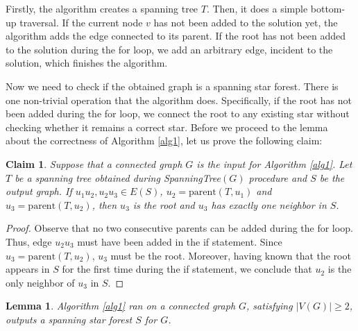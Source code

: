 \documentclass[en]{pracamgr}
\newtheorem{lemma}{Lemma}
\newtheorem{claim}{Claim}
\theoremstyle{definition}
\begin{document}
Firstly, the algorithm creates a spanning tree $T$. Then, it does a simple bottom-up traversal. If the current node $v$ has not been added to the solution yet, the algorithm adds the edge connected to its parent. If the root has not been added to the solution during the for loop, we add an arbitrary edge, incident to the solution, which finishes the algorithm.

Now we need to check if the obtained graph is a spanning star forest. There is one non-trivial operation that the algorithm does. Specifically, if the root has not  been added during the for loop, we connect the root to any existing star without checking whether it remains a correct star. Before we proceed to the lemma about the correctness of Algorithm \ref{alg1}, let us prove the following claim:

\begin{claim}\label{ssf root}
	Suppose that a connected graph $G$ is the input for Algorithm \ref{alg1}. Let $T$ be a spanning tree obtained during \textrm{SpanningTree}$(G)$ procedure and $S$ be the output graph. If $u_1 u_2,u_2 u_3 \in E(S)$, $u_2 = \textrm{parent}(T,u_1)$ and $u_3=\textrm{parent}(T,u_2)$, then $u_3$ is the root and $u_3$ has exactly one neighbor in $S$.
\end{claim}

\begin{proof}
	Observe that no two consecutive parents can be added during the for loop. Thus, edge $u_2 u_3$ must have been added in the if statement. Since $u_3 = \textrm{parent}(T,u_2)$, $u_3$ must be the root. Moreover, having known that the root appears in $S$ for the first time during the if statement, we conclude that $u_2$ is the only neighbor of $u_3$ in $S$. 
\end{proof}

\begin{lemma}\label{alg1 correctness}
	Algorithm \ref{alg1} ran on a connected graph $G$, satisfying $|V(G)| \geq 2$, outputs a spanning star forest $S$ for $G$.
\end{lemma}
\end{document}

